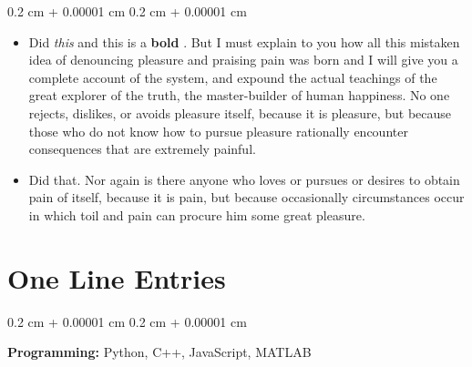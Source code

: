 \documentclass[10pt, letterpaper]{article}
\newenvironment{highlights}{
    \begin{itemize}[
        topsep=0.10 cm,
        parsep=0.10 cm,
        partopsep=0pt,
        itemsep=0pt,
        leftmargin=0.4 cm + 10pt
    ]
}{
    \end{itemize}
} %
\newenvironment{onecolentry}{
    \begin{adjustwidth}{
        0.2 cm + 0.00001 cm
    }{
        0.2 cm + 0.00001 cm
    }
}{
    \end{adjustwidth}
} %
\let\hrefWithoutArrow\href
\renewcommand{\href}[2]{\hrefWithoutArrow{#1}{\mbox{\ifthenelse{\equal{#2}{}}{ }{#2 }\raisebox{.15ex}{\footnotesize \faExternalLink*}}}}
\begin{document}
        \vspace{0.10 cm-3px}
        \begin{onecolentry}
            \begin{highlights}
                \item Did \textit{this} and this is a \textbf{bold} \href{https://example.com}{link}. But I must explain to you how all this mistaken idea of denouncing pleasure and praising pain was born and I will give you a complete account of the system, and expound the actual teachings of the great explorer of the truth, the master-builder of human happiness. No one rejects, dislikes, or avoids pleasure itself, because it is pleasure, but because those who do not know how to pursue pleasure rationally encounter consequences that are extremely painful.
                \item Did that. Nor again is there anyone who loves or pursues or desires to obtain pain of itself, because it is pain, but because occasionally circumstances occur in which toil and pain can procure him some great pleasure.
            \end{highlights}
        \end{onecolentry}



    
    \section{One Line Entries}

        
        \begin{onecolentry}
            \textbf{Pro\textnormal{gram}ming:} Python, C++, JavaScript, MATLAB
        \end{onecolentry}


    
\end{document}
